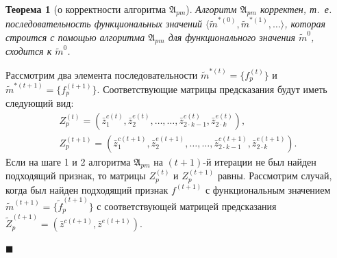 \documentclass[a4paper, 12pt]{article}
\theoremstyle{plain}
\newtheorem{Theorem}{Теорема}
\newenvironment{Proof}%
	{\par\noindent{\bf Доказательство.}}%
	{\hfill$\scriptstyle\blacksquare$}
\begin{document}
	\begin{Theorem}[о корректности алгоритма $\mathfrak A_{pm}$]
		Алгоритм $\mathfrak A_{pm}$ корректен, т.~е. последовательность функциональных значений $\langle\tilde m^{*(0)},\tilde m^{*(1)},\dots\rangle$, которая строится с помощью алгоритма $\mathfrak A_{pm}$ для функционального значения $\tilde m^0$, сходится к $\tilde m^0$.
	\end{Theorem}
	
	\begin{Proof}
		Рассмотрим два элемента последовательности $\tilde m^{*(t)}=\{f_p^{(t)}\}$ и $\tilde m^{*(t+1)}=\{f_p^{(t+1)}\}$. Соответствующие матрицы предсказания будут иметь следующий вид:
		\begin{eqnarray}
		Z_p^{(t)}=(\bar z_1^{c(t)},\bar z_2^{e(t)},\dots,\dots,\bar z_{2\cdot k-1}^{c(t)},\bar z_{2\cdot k}^{e(t)}),\\
		Z_p^{(t+1)}=(\bar z_1^{c(t+1)},\bar z_2^{e(t+1)},\dots,\dots,\bar z_{2\cdot k-1}^{c(t+1)},\bar z_{2\cdot k}^{e(t+1)}).
		\end{eqnarray}
		Если на шаге 1 и 2 алгоритма $\mathfrak A_{pm}$ на $(t+1)$-й итерации не был найден подходящий признак, то матрицы $Z_p^{(t)}$ и $Z_p^{(t+1)}$ равны. Рассмотрим случай, когда был найден подходящий признак $f^{(t+1)}$ с функциональным значением $\tilde m^{(t+1)}=\{\tilde f_p^{(t+1)}\}$ с соответствующей матрицей предсказания $\tilde Z_p^{(t+1)}=(\bar z^{c(t+1)},\bar z^{e(t+1)})$.
		

\end{Proof}
\end{document}
